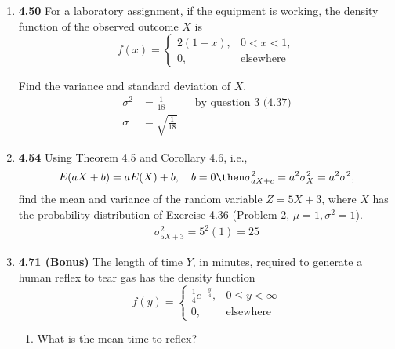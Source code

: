 \documentclass[basic, header]{nosvagor-notes}
\begin{document}
\begin{enumerate}[leftmargin=1.5em, itemsep=2em]
  \item \textbf{4.50} For a laboratory assignment, if the equipment is working,
    the density function of the observed outcome \(X\) is
    \[%
      f(x) =
      \begin{cases}
        2(1-x), & 0 < x < 1, \\
        0,      & \text{elsewhere}
      \end{cases}
    \]%

    Find the variance and standard deviation of \(X\).
    \begin{align*}
      \sigma^2 &= \boxed{\frac{1}{18}} && \text{by question 3 (4.37)} \\
      \sigma &= \boxed{\sqrt{\frac{1}{18}}}
    \end{align*}

  \newpage %

  \item \textbf{4.54} Using Theorem 4.5 and Corollary 4.6, i.e.,
    \[%
      E(aX + b) = a E(X) + b, \quad b = 0 \then \sigma^2_{aX+c} = a^2 \sigma_X^2 = a^2 \sigma^2,
    \]%
    find the mean and variance of the random variable \(Z = 5X +3\), where
    \(X\) has the probability distribution of Exercise 4.36 (Problem 2, \(\mu = 1, \sigma^2 = 1\)).
    \begin{align*}
      \sigma^2_{5X+3} = 5^2(1) = \boxed{25}
    \end{align*}

  \item \textbf{4.71 (Bonus)} The length of time \(Y\), in minutes, required
    to generate a human reflex to tear gas has the density function
    \[%
      f(y) =
      \begin{cases}
        \frac{1}{4}e^{-\frac{y}{4}}, & 0 \leq y < \infty \\
         0, & \text{elsewhere}
      \end{cases}
    \]%
    \begin{enumerate}[leftmargin=1.6em]

      \item What is the mean time to reflex?


\end{enumerate}
\end{enumerate}
\end{document}
